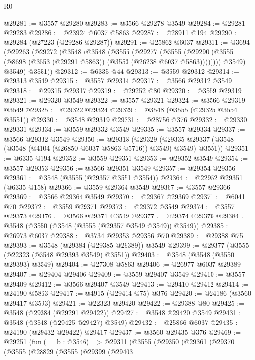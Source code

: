\begin{lexlean}{R0}
\begin{coremodule}
@29281 := @3557 @29280
@29283 := @3566 @29278 @3549
@29284 := @29281 @29283
@29286 := @23924 @6037 @5863
@29287 := @28911 @194
@29290 := @29284 (@27223 (@29286 @29287))
@29291 := @25862 @6037
@29311 := @3694
    (@29263
      (@29272
        (@3548
          (@3548
            (@3555
              (@29277
                (@3555
                  (@29290 (@3555 (@8698 (@3553 (@29291 @5863)) (@3553 (@26238 @6037 @5863))))))))
            @3549)
          @3549)
        @3551))
@29312 := @6335 @44
@29313 := @3559 @29312
@29314 := @29313 @3549
@29315 := @3557 @29314
@29317 := @3566 @29312 @3549
@29318 := @29315 @29317
@29319 := @29252 @80
@29320 := @3559 @29319
@29321 := @29320 @3549
@29322 := @3557 @29321
@29324 := @3566 @29319 @3549
@29325 := @29322 @29324
@29329 := @3548 (@3555 (@29325 @3554 @3551))
@29330 := @3548 @29319
@29331 := @28756 @376
@29332 := @29330 @29331
@29334 := @3559 @29332 @3549
@29335 := @3557 @29334
@29337 := @3566 @29332 @3549
@29350 := @29318
    (@29329 (@29335 @29337 (@3548 (@3548 (@4104 (@26850 @6037 @5863 @5716)) @3549) @3549) @3551))
@29351 := @6335 @194
@29352 := @3559 @29351
@29353 := @29352 @3549
@29354 := @3557 @29353
@29356 := @3566 @29351 @3549
@29357 := @29354 @29356
@29361 := @3548 (@3555 (@29357 @3551 @3554))
@29364 := @22952 @29351 (@6335 @158)
@29366 := @3559 @29364 @3549
@29367 := @3557 @29366
@29369 := @3566 @29364 @3549
@29370 := @29367 @29369
@29371 := @6041 @70
@29372 := @3559 @29371
@29373 := @29372 @3549
@29374 := @3557 @29373
@29376 := @3566 @29371 @3549
@29377 := @29374 @29376
@29384 := @3548 (@3550 (@3548 (@3555 (@29357 @3549 @3549)) @3549))
@29385 := @26973 @6037
@29388 := @3734 @29353 @29356 @70
@29389 := @29388 @75
@29393 := @3548 (@29384 (@29385 @29389)) @3549
@29399 := @29377 (@3555 (@22323 (@3548 @29393 @3549) @3551))
@29403 := @3548 (@3548 (@3550 @29393) @3549)
@29404 := @27308 @5863
@29406 := @26977 @6037 @29389
@29407 := @29404 @29406
@29409 := @3559 @29407 @3549
@29410 := @3557 @29409
@29412 := @3566 @29407 @3549
@29413 := @29410 @29412
@29414 := @24190 @5863
@29417 := @4915 (@29414 @75) @376
@29420 := @24186 (@3560 @29417 @3593)
@29421 := @22323 @29420
@29422 := @29388 @80
@29425 := @3548 (@29384 (@29291 @29422))
@29427 := @3548 @29420 @3549
@29431 := @3548 (@3548 (@29425 @29427) @3549)
@29432 := @25866 @6037
@29435 := @24190 (@29432 @29422) @29417
@29437 := @3560 @29435 @376
@29469 := @29251
    (fun (__b : @3546) =>
    @29311
      (@3555
        (@29350
          (@29361
            (@29370
              (@3555
                (@28829
                  (@3555
                    (@29399
                      (@29403

\end{coremodule}
\end{lexlean}
